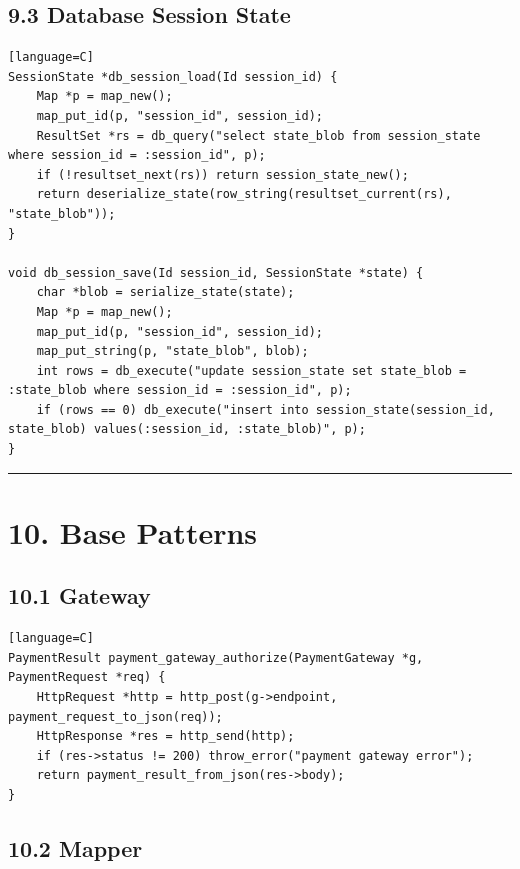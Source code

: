 \documentclass[11pt]{article}
\begin{document}
\subsection{9.3 Database Session State}\label{database-session-state}

\begin{verbatim}[language=C]
SessionState *db_session_load(Id session_id) {
    Map *p = map_new();
    map_put_id(p, "session_id", session_id);
    ResultSet *rs = db_query("select state_blob from session_state where session_id = :session_id", p);
    if (!resultset_next(rs)) return session_state_new();
    return deserialize_state(row_string(resultset_current(rs), "state_blob"));
}

void db_session_save(Id session_id, SessionState *state) {
    char *blob = serialize_state(state);
    Map *p = map_new();
    map_put_id(p, "session_id", session_id);
    map_put_string(p, "state_blob", blob);
    int rows = db_execute("update session_state set state_blob = :state_blob where session_id = :session_id", p);
    if (rows == 0) db_execute("insert into session_state(session_id, state_blob) values(:session_id, :state_blob)", p);
}
\end{verbatim}

\begin{center}\rule{0.5\linewidth}{0.5pt}\end{center}

\section{10. Base Patterns}\label{base-patterns}

\subsection{10.1 Gateway}\label{gateway}

\begin{verbatim}[language=C]
PaymentResult payment_gateway_authorize(PaymentGateway *g, PaymentRequest *req) {
    HttpRequest *http = http_post(g->endpoint, payment_request_to_json(req));
    HttpResponse *res = http_send(http);
    if (res->status != 200) throw_error("payment gateway error");
    return payment_result_from_json(res->body);
}
\end{verbatim}

\subsection{10.2 Mapper}\label{mapper}
\end{document}
